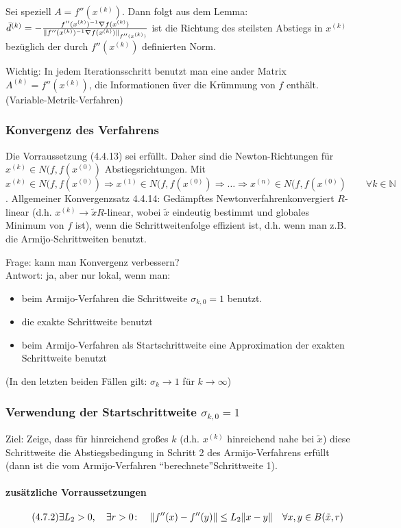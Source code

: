 \documentclass[ngerman,halfparskip]{scrartcl}
\DeclarePairedDelimiter{\norm}{\lVert}{\rVert}
\theoremstyle{definition}
\newcommand*{\N}{\mathbb{N}}      %
\begin{document}
Sei speziell $A=f''(x^{(k)})$. Dann folgt aus dem Lemma: $\bar d ^{(k)}=-\frac {f''(x^{(k)})^{-1}\nabla f(x^{(k)})}{\norm{f''(x^{(k)})^{-1}\nabla f(x^{(k)})}_{f''(x^{(k)})}}$ ist die Richtung des steilsten Abstiegs in $x^{(k)}$ bezüglich der durch $f''(x^{(k)})$ definierten Norm.

Wichtig: In jedem Iterationsschritt benutzt man eine ander Matrix $A^{(k)}=f''(x^{(k)})$, die Informationen üver die Krümmung von $f$ enthält. (Variable-Metrik-Verfahren)

\subsubsection{Konvergenz des Verfahrens}
Die Vorraussetzung (4.4.13) sei erfüllt. Daher sind die Newton-Richtungen für $x^{(k)}\in N(f,f(x^{(0)})$ Abstiegsrichtungen. Mit $x^{(k)}\in N(f,f(x^{(0)})\Rightarrow x^{(1)}\in N(f,f(x^{(0)})\Rightarrow \ldots \Rightarrow x^{(n)}\in N(f,f(x^{(0)})\qquad \forall k\in\N$. Allgemeiner Konvergenzsatz 4.4.14: Gedämpftes Newtonverfahrenkonvergiert $R$-linear (d.h. $x^{(k)}\rightarrow \tilde x R$-linear, wobei $\tilde x$ eindeutig bestimmt und globales Minimum von $f$ ist), wenn die Schrittweitenfolge effizient ist, d.h. wenn man z.B. die Armijo-Schrittweiten benutzt. 

Frage: kann man Konvergenz verbessern?\\
Antwort:  ja, aber nur lokal, wenn man:
\begin{itemize}
\item beim Armijo-Verfahren die Schrittweite $\sigma_{k,0}=1$ benutzt.
\item die exakte Schrittweite benutzt
\item beim Armijo-Verfahren als Startschrittweite eine Approximation der exakten Schrittweite benutzt
\end{itemize}
(In den letzten beiden Fällen gilt: $\sigma_k\rightarrow 1$ für $k\rightarrow\infty$)


\subsubsection*{Verwendung der Startschrittweite $\sigma_{k,0}=1$}
Ziel: Zeige, dass für hinreichend großes $k$ (d.h. $x^{(k)}$ hinreichend nahe bei $\tilde x$) diese Schrittweite die Abstiegsbedingung in Schritt 2 des Armijo-Verfahrens erfüllt (dann ist die vom Armijo-Verfahren "`berechnete"'Schrittweite 1).

\paragraph{zusätzliche Vorraussetzungen}\begin{gather*}\tag{4.7.2}
\exists L_2>0,\quad \exists r>0\colon  \quad \norm{ f''(x)-f''(y)}\leq L_2\norm{x-y}\quad \forall x,y\in B(\tilde x, r)
\end{gather*}
\end{document}
